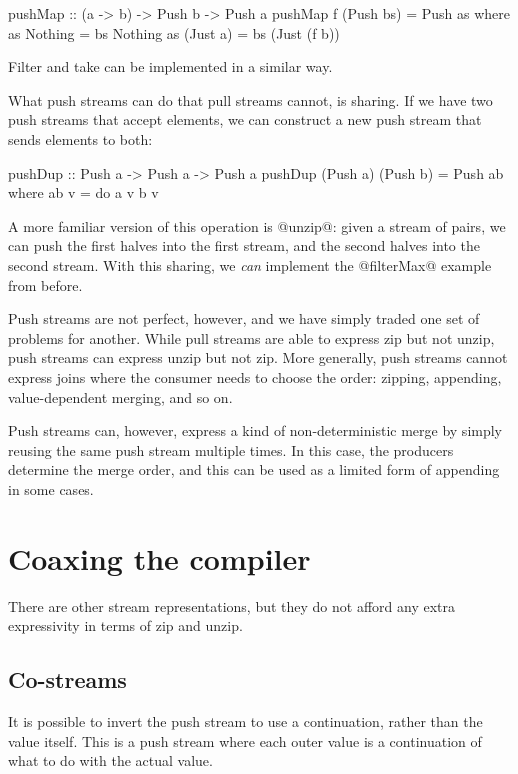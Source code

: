 \begin{code}
pushMap :: (a -> b) -> Push b -> Push a
pushMap f (Push bs) = Push as
 where
  as Nothing  = bs Nothing
  as (Just a) = bs (Just (f b))
\end{code}

Filter and take can be implemented in a similar way.

What push streams can do that pull streams cannot, is sharing.
If we have two push streams that accept elements, we can construct a new push stream that sends elements to both:

\begin{code}
pushDup :: Push a -> Push a -> Push a
pushDup (Push a) (Push b) = Push ab
 where
  ab v = do
   a v
   b v
\end{code}

A more familiar version of this operation is @unzip@: given a stream of pairs, we can push the first halves into the first stream, and the second halves into the second stream.
With this sharing, we \emph{can} implement the @filterMax@ example from before.

Push streams are not perfect, however, and we have simply traded one set of problems for another.
While pull streams are able to express zip but not unzip, push streams can express unzip but not zip.
More generally, push streams cannot express joins where the consumer needs to choose the order: zipping, appending, value-dependent merging, and so on.

Push streams can, however, express a kind of non-deterministic merge by simply reusing the same push stream multiple times.
In this case, the producers determine the merge order, and this can be used as a limited form of appending in some cases.

\section{Coaxing the compiler}
\label{sec:process:streams:coaxing}
There are other stream representations, but they do not afford any extra expressivity in terms of zip and unzip.

\subsection{Co-streams}
It is possible to invert the push stream to use a continuation, rather than the value itself.
This is a push stream where each outer value is a continuation of what to do with the actual value.

